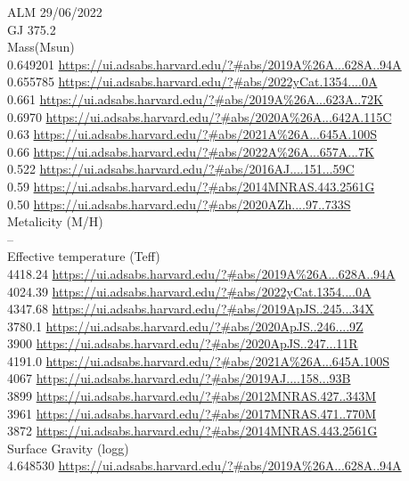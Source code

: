 ALM 29/06/2022\\
GJ 375.2\\
Mass(Msun)\\
0.649201 \url{https://ui.adsabs.harvard.edu/?#abs/2019A%26A...628A..94A}\\
0.655785 \url{https://ui.adsabs.harvard.edu/?#abs/2022yCat.1354....0A}\\
0.661 \url{https://ui.adsabs.harvard.edu/?#abs/2019A%26A...623A..72K}\\
0.6970 \url{https://ui.adsabs.harvard.edu/?#abs/2020A%26A...642A.115C}\\
0.63 \url{https://ui.adsabs.harvard.edu/?#abs/2021A%26A...645A.100S}\\
0.66 \url{https://ui.adsabs.harvard.edu/?#abs/2022A%26A...657A...7K}\\
0.522 \url{https://ui.adsabs.harvard.edu/?#abs/2016AJ....151...59C}\\
0.59 \url{https://ui.adsabs.harvard.edu/?#abs/2014MNRAS.443.2561G}\\
0.50 \url{https://ui.adsabs.harvard.edu/?#abs/2020AZh....97..733S}\\
Metalicity (M/H)\\
--\\
Effective temperature (Teff) \\
4418.24 \url{https://ui.adsabs.harvard.edu/?#abs/2019A%26A...628A..94A}\\
4024.39	\url{https://ui.adsabs.harvard.edu/?#abs/2022yCat.1354....0A}\\
4347.68 \url{https://ui.adsabs.harvard.edu/?#abs/2019ApJS..245...34X}\\
3780.1 \url{https://ui.adsabs.harvard.edu/?#abs/2020ApJS..246....9Z}\\
3900 \url{https://ui.adsabs.harvard.edu/?#abs/2020ApJS..247...11R}\\
4191.0 \url{https://ui.adsabs.harvard.edu/?#abs/2021A%26A...645A.100S}\\
4067 \url{https://ui.adsabs.harvard.edu/?#abs/2019AJ....158...93B}\\
3899 \url{https://ui.adsabs.harvard.edu/?#abs/2012MNRAS.427..343M}\\
3961 \url{https://ui.adsabs.harvard.edu/?#abs/2017MNRAS.471..770M}\\
3872 \url{https://ui.adsabs.harvard.edu/?#abs/2014MNRAS.443.2561G}\\
Surface Gravity (logg) \\
4.648530 \url{https://ui.adsabs.harvard.edu/?#abs/2019A%26A...628A..94A}\\
